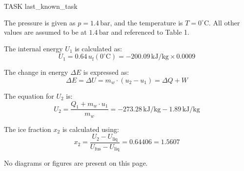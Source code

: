 TASK {last_known_task}

The pressure is given as \( p = 1.4 \, \text{bar} \), and the temperature is \( T = 0^\circ\text{C} \). All other values are assumed to be at \( 1.4 \, \text{bar} \) and referenced to Table 1.

The internal energy \( U_1 \) is calculated as:
\[
U_1 = 0.64 \, u_{\text{f}}(0^\circ\text{C}) = -200.09 \, \text{kJ/kg} \times 0.0009
\]

The change in energy \( \Delta E \) is expressed as:
\[
\Delta E = \Delta U = m_w \cdot (u_2 - u_1) = \Delta Q + W
\]

The equation for \( U_2 \) is:
\[
U_2 = \frac{Q_1 + m_w \cdot u_1}{m_w} = -273.28 \, \text{kJ/kg} - 1.89 \, \text{kJ/kg}
\]

The ice fraction \( x_2 \) is calculated using:
\[
x_2 = \frac{U_2 - U_{\text{liq}}}{U_{\text{fus}} - U_{\text{liq}}} = 0.64406 = 1.5607
\]

No diagrams or figures are present on this page.